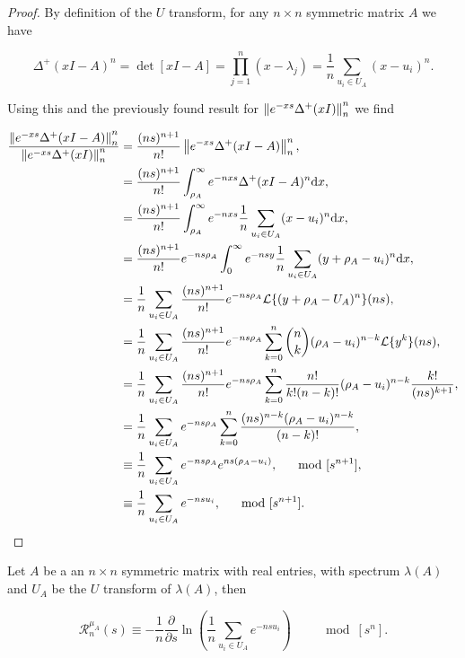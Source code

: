 \begin{proof}
    By definition of the $U$ transform, for any $n\times n$ symmetric matrix $A$ we have


    \begin{equation*}
        \Delta^+(xI - A)^n = \det[xI - A] = \prod_{j=1}^n (x - \lambda_j) = \frac1n \sum_{u_i \in U_A} (x-u_i)^n.
    \end{equation*}

    Using this and the previously found result for $\left\lVert e^{-xs}\Delta^+(xI)\right\rVert_n^n$ we find

    \begin{align*}
        \frac{\left\lVert e^{-xs}\Delta^+(xI - A)\right\rVert_n^n}{\left\lVert e^{-xs}\Delta^+(xI)\right\rVert_n^n} &= \frac{(ns)^{n+1}}{n!}\left\lVert e^{-xs}\Delta^+(xI - A)\right\rVert_n^n,\\
        &= \frac{(ns)^{n+1}}{n!}\int_{\rho_A}^\infty e^{-nxs} \Delta^+(xI - A)^n \mathrm d x,\\
        &= \frac{(ns)^{n+1}}{n!}\int_{\rho_A}^\infty e^{-nxs} \frac1n \sum_{u_i \in U_A} (x-u_i)^n \mathrm d x,\\
        &= \frac{(ns)^{n+1}}{n!}e^{-ns\rho_A}\int_{0}^\infty e^{-nsy} \frac1n \sum_{u_i \in U_A} (y + \rho_A-u_i)^n \mathrm d x, \\
        &= \frac1n \sum_{u_i\in U_A} \frac{(ns)^{n+1}}{n!}e^{-ns\rho_A} \mathcal L\{(y + \rho_A - U_A)^n\}(ns), \\
        &=  \frac1n \sum_{u_i\in U_A} \frac{(ns)^{n+1}}{n!}e^{-ns\rho_A} \sum_{k=0}^n \binom nk  (\rho_A - u_i)^{n-k}\mathcal L\{y^k\}(ns), \\
        &= \frac1n \sum_{u_i\in U_A} \frac{(ns)^{n+1}}{n!}e^{-ns\rho_A} \sum_{k=0}^n \frac{n!}{k!(n-k)!}  (\rho_A - u_i)^{n-k}\frac{k!}{(ns)^{k+1}}, \\
        &= \frac1n \sum_{u_i \in U_A} e^{-ns\rho_A} \sum_{k=0}^n \frac{(ns)^{n-k}(\rho_A - u_i)^{n-k}}{(n-k)!}, \\
        &\equiv \frac1n \sum_{u_i\in U_A} e^{-ns\rho_A} e^{ns(\rho_A - u_i)}, \quad \mod [s^{n+1}],\\
        &\equiv \frac1n \sum_{u_i\in U_A} e^{-nsu_i}, \quad \mod [s^{n+1}].
    \end{align*}
\end{proof}

\begin{corollary} \label{corollary:R_n_as_a_logarithm}
    Let $A$ be a an $n\times n$ symmetric matrix with real entries, with spectrum $\lambda(A)$ and $U_A$ be the $U$ transform of $\lambda(A)$, then 

    \begin{equation*}
        \mathcal R_{n}^{\mu_A}(s) \equiv - \frac1n \frac{\partial}{\partial s} \ln \left(\frac1n \sum_{u_i \in U_A} e^{-nsu_i} \right) \qquad \mod [s^n].
    \end{equation*}
\end{corollary}

